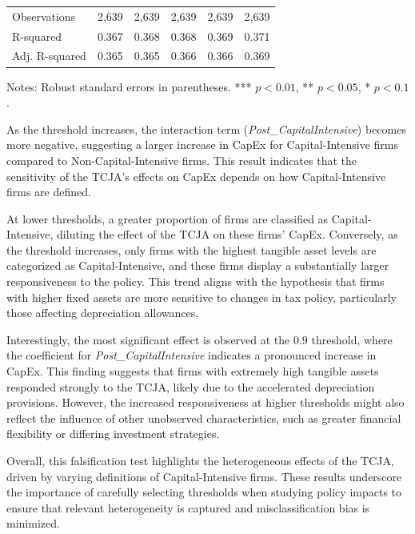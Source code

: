 \documentclass[11pt]{article}
\begin{document}
\begin{table}
\begin{tabular}{lccccc}
        \midrule
        Observations         & 2,639       & 2,639       & 2,639       & 2,639       & 2,639       \\
        R-squared            & 0.367       & 0.368       & 0.368       & 0.369       & 0.371       \\
        Adj. R-squared       & 0.365       & 0.365       & 0.366       & 0.366       & 0.369       \\
        \bottomrule
    \end{tabular}
    \begin{flushleft}
        \footnotesize
        Notes: Robust standard errors in parentheses. *** \(p<0.01\), ** \(p<0.05\), * \(p<0.1\).
    \end{flushleft}
\end{table}

As the threshold increases, the interaction term (\textit{Post\_CapitalIntensive}) becomes more negative, suggesting a larger increase in CapEx for Capital-Intensive firms compared to Non-Capital-Intensive firms. This result indicates that the sensitivity of the TCJA’s effects on CapEx depends on how Capital-Intensive firms are defined.

At lower thresholds, a greater proportion of firms are classified as Capital-Intensive, diluting the effect of the TCJA on these firms' CapEx. Conversely, as the threshold increases, only firms with the highest tangible asset levels are categorized as Capital-Intensive, and these firms display a substantially larger responsiveness to the policy. This trend aligns with the hypothesis that firms with higher fixed assets are more sensitive to changes in tax policy, particularly those affecting depreciation allowances.

Interestingly, the most significant effect is observed at the 0.9 threshold, where the coefficient for \textit{Post\_CapitalIntensive} indicates a pronounced increase in CapEx. This finding suggests that firms with extremely high tangible assets responded strongly to the TCJA, likely due to the accelerated depreciation provisions. However, the increased responsiveness at higher thresholds might also reflect the influence of other unobserved characteristics, such as greater financial flexibility or differing investment strategies.

Overall, this falsification test highlights the heterogeneous effects of the TCJA, driven by varying definitions of Capital-Intensive firms. These results underscore the importance of carefully selecting thresholds when studying policy impacts to ensure that relevant heterogeneity is captured and misclassification bias is minimized.
\end{document}
